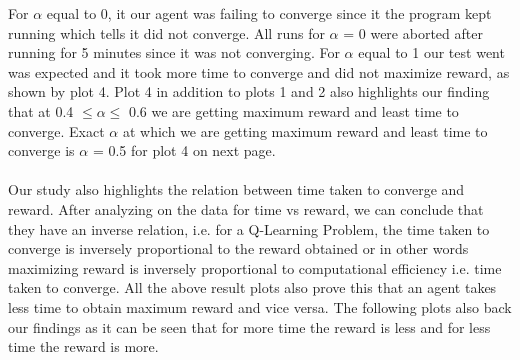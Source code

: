 \documentclass[conference]{IEEEtran}
\begin{document}

For $\alpha$ equal to 0, it our agent was failing to converge since it the program kept running which tells it did not converge. All runs for $\alpha$ = 0 were aborted after running for 5 minutes since it was not converging. For $\alpha$ equal to 1 our test went was expected and it took more time to converge and did not maximize reward, as shown by plot 4. Plot 4 in addition to plots 1 and 2 also highlights our finding that at 0.4 $ \leq \alpha \leq$ 0.6 we are getting maximum reward and least time to converge. Exact $\alpha$ at which we are getting maximum reward and least time to converge is $\alpha$ = 0.5 for plot 4 on next page. \\ \\ Our study also highlights the relation between time taken to converge and reward. After analyzing on the data for time vs reward, we can conclude that they have an inverse relation, i.e. for a Q-Learning Problem, the time taken to converge is inversely proportional to the reward obtained or in other words maximizing reward is inversely proportional to computational efficiency i.e. time taken to converge. All the above result plots also prove this that an agent takes less time to obtain maximum reward and vice versa. The following plots also back our findings as it can be seen that for more time the reward is less and for less time the reward is more. 
\end{document}
